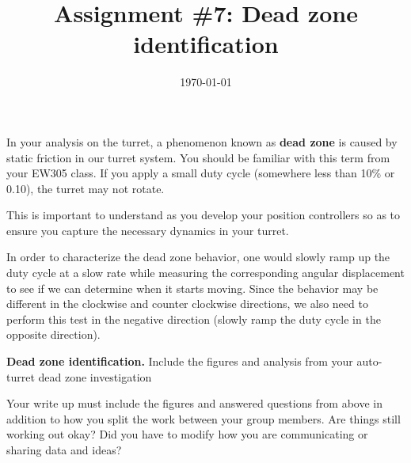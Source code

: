 \documentclass[noanswers]{exam}
\title{Assignment \#7: Dead zone identification}
\author{\usnaAuthorShort}
\date{\today}
\begin{document}
\maketitle

In your analysis on the turret, a phenomenon known as \textbf{dead zone} is caused by static friction in our turret system.  You should be familiar with this term from your EW305 class.  If you apply a small duty cycle (somewhere less than 10\% or 0.10), the turret may not rotate.

This is important to understand as you develop your position controllers so as to ensure you capture the necessary dynamics in your turret.  

In order to characterize the dead zone behavior, one would slowly ramp up the duty cycle at a slow rate while measuring the corresponding angular displacement to see if we can determine when it starts moving.  Since the behavior may be different in the clockwise and counter clockwise directions, we also need to perform this test in the negative direction (slowly ramp the duty cycle in the opposite direction).

\begin{questions}
\question \textbf{Dead zone identification.} Include the figures and analysis from your auto-turret dead zone investigation

\question Your write up must include the figures and answered questions from above in addition to how you split the work between your group members.  Are things still working out okay?  Did you have to modify how you are communicating or sharing data and ideas?  
\end{questions}
\end{document}
